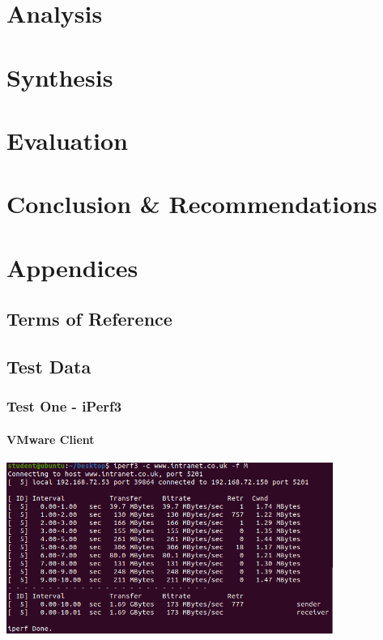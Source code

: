 \documentclass[12pt,twoside]{book}
\begin{document}
\frontmatter




\tableofcontents

\mainmatter


\part{Analysis}


\part{Synthesis}


\part{Evaluation}


\part{Conclusion \& Recommendations}






\part{Appendices}
\appendix

\chapter{Terms of Reference}
\label{appendix:tor}

\chapter{Test Data}
\section{Test One - iPerf3}
\subsection{VMware Client}
\includegraphics[width=0.80\textwidth]{Appendicies/VMwareTest1Client.PNG}
\end{document}
